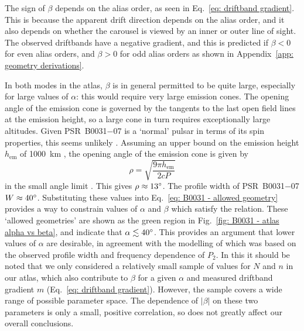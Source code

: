 The sign of $\beta$ depends on the alias order, as seen in Eq.~\eqref{eq: driftband gradient}. This is because the apparent drift direction depends on the alias order, and it also depends on whether the carousel is viewed by an inner or outer line of sight. The observed driftbands have a negative gradient, and this is predicted if $\beta < 0$ for even alias orders, and $\beta > 0$ for odd alias orders as shown in Appendix~\ref{app: geometry derivations}. %

In both modes in the atlas, $\beta$ is in general permitted to be quite large, especially for large values of $\alpha$: this would require very large emission cones. The opening angle of the emission cone is governed by the tangents to the last open field lines at the emission height, so a large cone in turn requires exceptionally large altitudes. Given PSR~B0031$-$07 is a `normal' pulsar in terms of its spin properties, this seems unlikely \citep[e.g][]{GLxx1998,  WJxx2008, JKxx2019}. 
Assuming an upper bound on the emission height $h_\mathrm{em}$ of 1000~km \citep[e.g.][]{KJxx2007}, the opening angle of the emission cone is given by 
\begin{equation}
    \label{eq: B0031 - cone angle}
    \rho = \sqrt{\frac{9\pi h_\mathrm{em}}{2cP}}
\end{equation}
in the small angle limit \citep[e.g. $h_\mathrm{em} \ll R_\mathrm{LC}$,][]{Rxxx1990}. This gives $\rho \approx 13^\circ$. The profile width of PSR~B0031$-$07 $W \approx 40^\circ$. Substituting these values into Eq.~\eqref{eq: B0031 - allowed geometry} provides a way to constrain values of $\alpha$ and $\beta$ which satisfy the relation. These `allowed geometries' are shown as the green region in Fig.~\ref{fig: B0031 - atlas alpha vs beta}, and indicate that $\alpha \lesssim 40^\circ$. This provides an argument that lower values of $\alpha$ are desirable, in agreement with the modelling of \citet{SMS+2007} which was based on the observed profile width and frequency dependence of $P_2$. In this it should be noted that we only considered a relatively small sample of values for $N$ and $n$ in our atlas, which also contribute to $\beta$ for a given $\alpha$ and measured driftband gradient $m$ (Eq.~\eqref{eq: driftband gradient}). However, the sample covers a wide range of possible parameter space. The dependence of $|\beta|$ on these two parameters is only a small, positive correlation, so does not greatly affect our overall conclusions.





